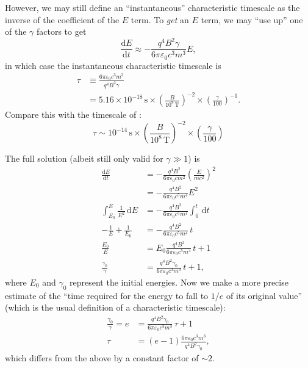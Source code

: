 \documentclass{book}
\newcommand{\deriv}[2]{\frac{\text{d}{#1}}{\text{d}{#2}}}
\begin{document}
However, we may still define an ``instantaneous'' characteristic timescale as the inverse of the coefficient of the $E$ term.
To \emph{get} an $E$ term, we may ``use up'' one of the $\gamma$ factors to get
\begin{equation}
    \deriv{E}{t}
        \approx -\frac{q^4B^2\gamma}{6\pi\varepsilon_0 c^3 m^3} E,
\end{equation}
in which case the instantaneous characteristic timescale is
\begin{equation}
\begin{aligned}
    \tau &\equiv \frac{6\pi\varepsilon_0 c^3 m^3}{q^4B^2\gamma} \\
        &= 5.16 \times 10^{-18}\,\text{s}
            \times \left(\frac{B}{10^8\,\text{T}}\right)^{-2}
            \times \left(\frac{\gamma}{100}\right)^{-1}.
\end{aligned}
\end{equation}
Compare this with the timescale of \citet{Luo1998}:
\begin{equation}
    \tau \sim 10^{-14}\,\text{s}
        \times \left(\frac{B}{10^8\,\text{T}}\right)^{-2}
        \times \left(\frac{\gamma}{100}\right)
\end{equation}

The full solution (albeit still only valid for $\gamma \gg 1$) is
\begin{equation}
\begin{aligned}
    \deriv{E}{t}
        &= -\frac{q^4B^2}{6\pi\varepsilon_0 c m^2}\left(\frac{E}{mc^2}\right)^2 \\
        &= -\frac{q^4B^2}{6\pi\varepsilon_0 c^5 m^4} E^2 \\
    \int_{E_0}^{E} \frac{1}{E^2}\,\text{d}E
        &= -\frac{q^4B^2}{6\pi\varepsilon_0 c^5 m^4} \int_0^t\,\text{d}t \\
    -\frac{1}{E} + \frac{1}{E_0}
        &= -\frac{q^4B^2}{6\pi\varepsilon_0 c^5 m^4}\,t \\
    \frac{E_0}{E}
        &= E_0 \frac{q^4B^2}{6\pi\varepsilon_0 c^5 m^4}\,t + 1 \\
    \frac{\gamma_0}{\gamma}
        &= \frac{q^4B^2\gamma_0}{6\pi\varepsilon_0 c^3 m^3}\,t + 1,
\end{aligned}
\end{equation}
where $E_0$ and $\gamma_0$ represent the initial energies.
Now we make a more precise estimate of the ``time required for the energy to fall to $1/e$ of its original value'' (which is the usual definition of a characteristic timescale):
\begin{equation}
\begin{aligned}
    \frac{\gamma_0}{\gamma} = e &= \frac{q^4B^2\gamma_0}{6\pi\varepsilon_0 c^3 m^3}\,\tau + 1 \\
    \tau &= (e - 1)\frac{6\pi\varepsilon_0 c^3 m^3}{q^4B^2\gamma_0},
\end{aligned}
\end{equation}
which differs from the above by a constant factor of $\sim2$.
\end{document}
